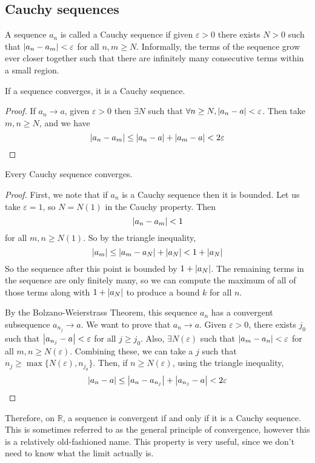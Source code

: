 \subsection{Cauchy sequences}
\begin{definition}
	A sequence \(a_n\) is called a Cauchy sequence if given \(\varepsilon > 0\) there exists \(N > 0\) such that \(\abs{a_n - a_m} < \varepsilon\) for all \(n, m \geq N\).
	Informally, the terms of the sequence grow ever closer together such that there are infinitely many consecutive terms within a small region.
\end{definition}
\begin{lemma}
	If a sequence converges, it is a Cauchy sequence.
\end{lemma}
\begin{proof}
	If \(a_n \to a\), given \(\varepsilon > 0\) then \(\exists N\) such that \(\forall n \geq N, \abs{a_n - a} < \varepsilon\).
	Then take \(m, n \geq N\), and we have
	\[
		\abs{a_n - a_m} \leq \abs{a_n - a} + \abs{a_m - a} < 2\varepsilon
	\]
\end{proof}
\begin{theorem}
	Every Cauchy sequence converges.
\end{theorem}
\begin{proof}
	First, we note that if \(a_n\) is a Cauchy sequence then it is bounded.
	Let us take \(\varepsilon = 1\), so \(N = N(1)\) in the Cauchy property.
	Then
	\[
		\abs{a_n - a_m} < 1
	\]
	for all \(m, n \geq N(1)\).
	So by the triangle inequality,
	\[
		\abs{a_m} \leq \abs{a_m - a_N} + \abs{a_N} < 1 + \abs{a_N}
	\]
	So the sequence after this point is bounded by \(1 + \abs{a_N}\).
	The remaining terms in the sequence are only finitely many, so we can compute the maximum of all of those terms along with \(1+\abs{a_N}\) to produce a bound \(k\) for all \(n\).

	By the Bolzano-Weierstrass Theorem, this sequence \(a_n\) has a convergent subsequence \(a_{n_j} \to a\).
	We want to prove that \(a_n \to a\).
	Given \(\varepsilon > 0\), there exists \(j_0\) such that \(\abs{a_{n_j} - a} < \varepsilon\) for all \(j \geq j_0\).
	Also, \(\exists N(\varepsilon)\) such that \(\abs{a_m - a_n} < \varepsilon\) for all \(m, n \geq N(\varepsilon)\).
	Combining these, we can take a \(j\) such that \(n_j \geq \max \{ N(\varepsilon), n_{j_0} \}\).
	Then, if \(n \geq N(\varepsilon)\), using the triangle inequality,
	\[
		\abs{a_n - a} \leq \abs{a_n - a_{n_j}} + \abs{a_{n_j} - a} < 2\varepsilon
	\]
\end{proof}
\noindent Therefore, on \(\mathbb R\), a sequence is convergent if and only if it is a Cauchy sequence.
This is sometimes referred to as the general principle of convergence, however this is a relatively old-fashioned name.
This property is very useful, since we don't need to know what the limit actually is.

